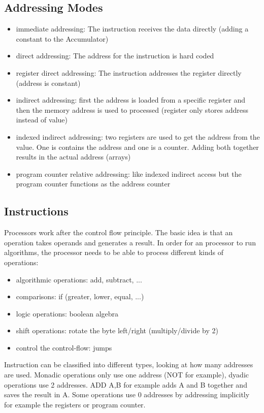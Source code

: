 \documentclass[a4paper]{scrartcl}
\begin{document}
            \subsection*{Addressing Modes}
            \begin{itemize}
                \item immediate addressing: The instruction receives the data directly (adding a constant to the Accumulator)
                \item direct addressing: The address for the instruction is hard coded
                \item register direct addressing: The instruction addresses the register directly (address is constant) 
                \item indirect addressing: first the address is loaded from a specific register and then the memory address is used to processed (register only stores address instead of value)
                \item indexed indirect addressing: two registers are used to get the address from the value. One is contains the address and one is a counter. Adding both together results in the actual address (arrays)
                \item program counter relative addressing: like indexed indirect access but the program counter functions as the address counter
            \end{itemize}

        \subsection{Instructions}
            Processors work after the control flow principle. The basic idea is that an operation takes operands and generates a result. In order for an processor to run 
            algorithms, the processor needs to be able to process different kinds of operations:
            \begin{itemize}
                \item algorithmic operations: add, subtract, ...
                \item comparisons: if (greater, lower, equal, ...)
                \item logic operations: boolean algebra
                \item shift operations: rotate the byte left/right (multiply/divide by 2)
                \item control the control-flow: jumps
            \end{itemize}
            Instruction can be classified into different types, looking at how many addresses are used. Monadic operations only use one address (NOT for example), dyadic 
            operations use 2 addresses. ADD A,B for example adds A and B together and saves the result in A. Some operations use 0 addresses by addressing implicitly for example the 
            registers or program counter. 
\end{document}
